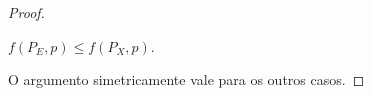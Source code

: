 \begin{proof}
\begin{center}
        $f(P_E,p) \leq f(P_X,p)$.
    \end{center}
    O argumento simetricamente vale para os outros casos.
    \begin{comment}
    \begin{figure}
        \centering
        \begin{minipage}[t]{0.3\textwidth}
        \begin{tikzpicture}[scale=0.75,
            node/.style={circle,draw,minimum size=2em, thick, font=\large},
            nodeGray/.style={circle,draw,minimum size=2em, thick, font=\large, fill=gray!55}]
            
            
            \node[node] (D) at (0,0) {};
            \node[node] (B) at (-2,-1.5) {};
            \node[node] (A) at (-3.3,-3) {};
            \node[node] (C) at (-0.7,-3) {};
            \node[node] (E) at (0.7,-3) {$5$};
            \node[node] (F) at (2,-1.5) {};
            \node[node] (G) at (3.3,-3) {};
            \node[node] (H) at (2.6,-4.5) {$6$};
            \node[node] (I) at (3.9,-4.5) {$7$};
            \node[node] (J) at (-3.9,-4.5) {$1$};
            \node[node] (K) at (-2.6,-4.5) {$2$};
            \node[node] (L) at (-1.3,-4.5) {$3$};
            \node[node] (M) at (-0.1,-4.5) {$4$};
            
            \draw[thick, ->] (D) -- (B);%
            \draw[thick, ->] (B) -- (A);%
            \draw[thick, ->] (B) -- (C);%
            \draw[thick, ->] (G) -- (I);%
            \draw[thick, ->] (G) -- (H);%
            \draw[thick, ->] (A) -- (J);%
            \draw[thick, ->] (A) -- (K);%
            \draw[thick, ->] (C) -- (L);%
            \draw[thick, ->] (C) -- (M);%
            

\end{comment}
\end{proof}
